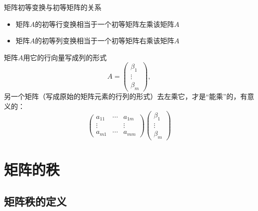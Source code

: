 \begin{frame}

\begin{block}{矩阵初等变换与初等矩阵的关系}
\begin{itemize}
\item 矩阵$A$的初等{\color{red}行}变换相当于一个初等矩阵{\color{red}左乘}该矩阵$A$
\item 矩阵$A$的初等{\color{green}列}变换相当于一个初等矩阵{\color{green}右乘}该矩阵$A$
\end{itemize}
\end{block}

\pause

矩阵$A$用它的行向量写成列的形式
\[A = \begin{pmatrix}
\beta_1 \\ \vdots \\ \beta_m
\end{pmatrix},\]
另一个矩阵（写成原始的矩阵元素的行列的形式）去左乘它，才是``能乘''的，有意义的：
\[\begin{pmatrix}
a_{11} & \cdots & a_{1m} \\ \vdots & & \vdots \\ a_{m1} & \cdots & a_{mm}
\end{pmatrix} \begin{pmatrix}
\beta_1 \\ \vdots \\ \beta_m
\end{pmatrix}\]

\end{frame}


\section{矩阵的秩}


\subsection{矩阵秩的定义}


